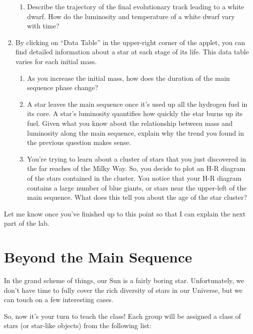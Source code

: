 \documentclass[11pt]{article}
\begin{document}
\begin{enumerate}
\begin{enumerate}
        \item Describe the trajectory of the final evolutionary track leading to a white dwarf. How do the luminosity and temperature of a white dwarf vary with time? 
    \end{enumerate}
    
    \item By clicking on ``Data Table'' in the upper-right corner of the applet, you can find detailed information about a star at each stage of its life. This data table varies for each initial mass. 
    \begin{enumerate}
        \item As you increase the initial mass, how does the duration of the main sequence phase change?
        
        \item A star leaves the main sequence once it's used up all the hydrogen fuel in its core. A star's luminosity quantifies how quickly the star burns up its fuel. Given what you know about the relationship between mass and luminosity along the main sequence, explain why the trend you found in the previous question makes sense.
        
        \item You're trying to learn about a cluster of stars that you just discovered in the far reaches of the Milky Way. So, you decide to plot an H-R diagram of the stars contained in the cluster. You notice that your H-R diagram contains a large number of blue giants, or stars near the upper-left of the main sequence. What does this tell you about the age of the star cluster?
        
    \end{enumerate}
\end{enumerate}

Let me know once you've finished up to this point so that I can explain the next part of the lab.

\section{Beyond the Main Sequence}
In the grand scheme of things, our Sun is a fairly boring star. Unfortunately, we don't have time to fully cover the rich diversity of stars in our Universe, but we can touch on a few interesting cases. 

So, now it's your turn to teach the class! Each group will be assigned a class of stars (or star-like objects) from the following list:
\end{document}
